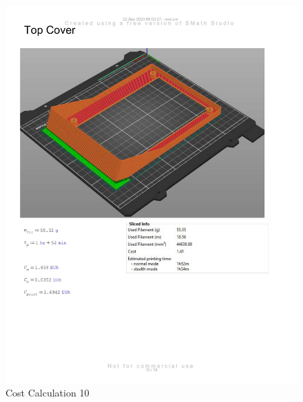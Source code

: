 \begin{figure}[H]
    \centering
    \includegraphics[width=\linewidth]{texs/appendix/data/costcalculation/cost1-10.jpg}
    \caption{Cost Calculation 10}
    \label{fig:cost-calculation-10}
\end{figure}


